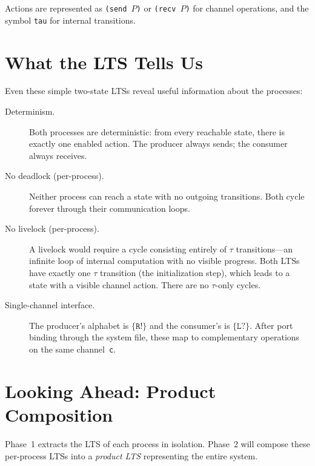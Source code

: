 \documentclass[11pt]{article}
\begin{document}
Actions are represented as \texttt{(send~$P$)} or
\texttt{(recv~$P$)} for channel operations, and the symbol
\texttt{tau} for internal transitions.

\section{What the LTS Tells Us}

Even these simple two-state LTSs reveal useful information about the
processes:

\begin{description}
\item[Determinism.]
  Both processes are deterministic: from every reachable state,
  there is exactly one enabled action.  The producer always sends;
  the consumer always receives.

\item[No deadlock (per-process).]
  Neither process can reach a state with no outgoing transitions.
  Both cycle forever through their communication loops.

\item[No livelock (per-process).]
  A livelock would require a cycle consisting entirely of $\tau$
  transitions---an infinite loop of internal computation with no
  visible progress.  Both LTSs have exactly one $\tau$ transition
  (the initialization step), which leads to a state with a visible
  channel action.  There are no $\tau$-only cycles.

\item[Single-channel interface.]
  The producer's alphabet is $\{\texttt{R!}\}$ and the consumer's is
  $\{\texttt{L?}\}$.  After port binding through the system file,
  these map to complementary operations on the same channel~\texttt{c}.
\end{description}

\section{Looking Ahead: Product Composition}

Phase~1 extracts the LTS of each process in isolation.  Phase~2 will
compose these per-process LTSs into a \emph{product LTS} representing
the entire system.
\end{document}
